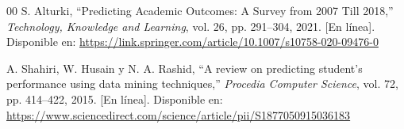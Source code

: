 \documentclass[conference]{IEEEtran}
\begin{document}
\begin{thebibliography}{00}
S. Alturki, ``Predicting Academic Outcomes: A Survey from 2007 Till
2018,'' \textit{Technology, Knowledge and Learning}, vol. 26,
pp. 291--304, 2021. [En línea]. Disponible en:
\url{https://link.springer.com/article/10.1007/s10758-020-09476-0}

A. Shahiri, W. Husain y N. A. Rashid, ``A review on predicting
student's performance using data mining techniques,''
\textit{Procedia Computer Science}, vol. 72, pp. 414--422, 2015.
[En línea]. Disponible en:
\url{https://www.sciencedirect.com/science/article/pii/S1877050915036183}

\end{thebibliography}
\end{document}
